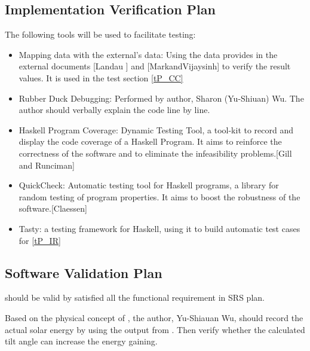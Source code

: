 \documentclass[12pt, titlepage]{article}
\begin{document}



\subsection{Implementation Verification Plan}\label{ImplementVP} 
The following tools will be used to facilitate testing: 

\begin{itemize}
\item Mapping data with the external's data: Using the data provides in the external documents [Landau ] \cite{Charles2001} and [MarkandVijaysinh] \cite{JacobsonandJadhav} to verify the result values. It is used in the test section \ref{tP_CC}

\item Rubber Duck Debugging: Performed by author, Sharon (Yu-Shiuan) Wu. The 
author should verbally explain the code line by line.
\item Haskell Program Coverage: Dynamic Testing Tool, a tool-kit to record 
and display the code coverage of a Haskell Program. It aims to reinforce the 
correctness of the software and to eliminate the infeasibility problems.[Gill
and Runciman] \cite{GillandRunciman}
\item QuickCheck: Automatic testing tool for Haskell programs, a library for
random testing of program properties. It aims to boost the robustness of the 
software.[Claessen] \cite{QuickCheck}
\item Tasty: a testing framework for Haskell, using it to build automatic test cases for \ref{tP_IR}
\end{itemize} 

 



\subsection{Software Validation Plan}

\progname{} should be valid by satisfied all the functional requirement in SRS 
plan.

Based on the physical concept of \progname, the author, Yu-Shiauan Wu, should
record the actual solar energy by using the output from \progname. Then verify
whether the calculated tilt angle can increase the energy gaining.
\end{document}

